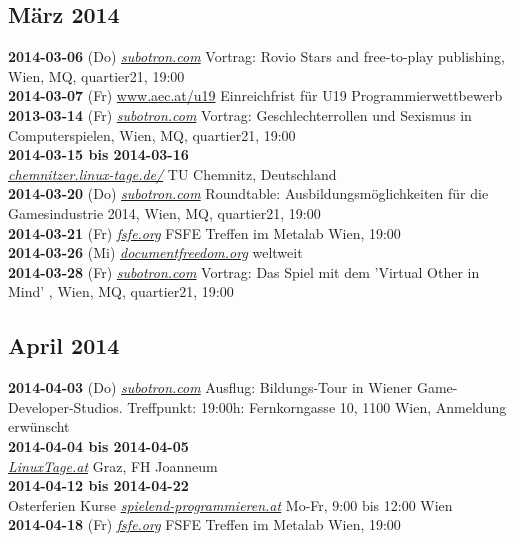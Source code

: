 \subsection*{März 2014}
\textbf{2014-03-06} (Do) \href{http://subotron.com/veranstaltung/rovio-stars/}{\textit{subotron.com}} Vortrag: Rovio Stars and free-to-play publishing, Wien, MQ, quartier21, 19:00\\
\textbf{2014-03-07} (Fr) \href{http://www.aec.at/u19/2012/03/08/article-3/}{www.aec.at/u19} Einreichfrist für U19 Programmierwettbewerb\\
\textbf{2013-03-14} (Fr) \href{http://subotron.com/veranstaltung/sexsim/}{\textit{subotron.com}} Vortrag: Geschlechterrollen und Sexismus in Computerspielen, Wien, MQ, quartier21, 19:00\\
\textbf{2014-03-15 bis 2014-03-16}\\ \href{http://chemnitzer.linux-tage.de/2014/de/info/}{\textit{chemnitzer.linux-tage.de/}} TU Chemnitz, Deutschland\\
\textbf{2014-03-20} (Do) \href{http://subotron.com/veranstaltung/ausbildung-2014/}{\textit{subotron.com}} Roundtable: Ausbildungsmöglichkeiten für die Gamesindustrie 2014, Wien, MQ, quartier21, 19:00\\
\textbf{2014-03-21} (Fr) \href{http://fsfe.org}{\textit{fsfe.org}} FSFE Treffen im Metalab Wien, 19:00\\ 
\textbf{2014-03-26} (Mi) \href{http://www.documentfreedom.org/}{\textit{documentfreedom.org}} weltweit\\
\textbf{2014-03-28} (Fr) \href{http://subotron.com/veranstaltung/virtual-other/}{\textit{subotron.com}} Vortrag: Das Spiel mit dem 'Virtual Other in Mind' , Wien, MQ, quartier21, 19:00\\
\subsection*{April 2014}
\textbf{2014-04-03} (Do) \href{http://subotron.com/veranstaltung/bildungstour-2/}{\textit{subotron.com}} Ausflug: Bildungs-Tour in Wiener Game-Developer-Studios. Treffpunkt: 19:00h: Fernkorngasse 10, 1100 Wien, Anmeldung erwünscht\\
\textbf{2014-04-04 bis 2014-04-05}\\ \href{http://linuxtage.at/}{\textit{LinuxTage.at}} Graz, FH Joanneum\\
\textbf{2014-04-12 bis 2014-04-22}\\ Osterferien Kurse \href{http://spielend-programmieren.at}{\textit{spielend-programmieren.at}} Mo-Fr, 9:00 bis 12:00 Wien\\
\textbf{2014-04-18} (Fr) \href{http://fsfe.org}{\textit{fsfe.org}} FSFE Treffen im Metalab Wien, 19:00\\
